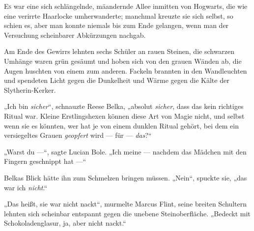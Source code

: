 
\lettrine{E}{s} war eine sich schlängelnde, mäandernde Allee inmitten von Hogwarts, die wie eine verirrte Haarlocke umherwanderte; manchmal kreuzte sie sich selbst, so schien es, aber man konnte niemals bis zum Ende gelangen, wenn man der Versuchung scheinbarer Abkürzungen nachgab.

Am Ende des Gewirrs lehnten sechs Schüler an rauen Steinen, die schwarzen Umhänge waren grün gesäumt und hoben sich von den grauen Wänden ab, die Augen huschten von einem zum anderen. Fackeln brannten in den Wandleuchten und spendeten Licht gegen die Dunkelheit und Wärme gegen die Kälte der Slytherin-Kerker.

„Ich bin \emph{sicher}“, schnauzte Reese Belka, „absolut \emph{sicher}, dass das kein richtiges Ritual war. Kleine Erstlingshexen können diese Art von Magie nicht, und selbst wenn sie es könnten, wer hat je von einem dunklen Ritual gehört, bei dem ein versiegeltes Grauen \emph{geopfert} wird — für — \emph{das}?“

„Warst du —“, sagte Lucian Bole.
„Ich meine — nachdem das Mädchen mit den Fingern geschnippt hat —“

Belkas Blick hätte ihn zum Schmelzen bringen müssen.
„Nein“, spuckte sie, „das war ich \emph{nicht}.“

„Das heißt, sie war nicht nackt“, murmelte Marcus Flint, seine breiten Schultern lehnten sich scheinbar entspannt gegen die unebene Steinoberfläche.
„Bedeckt mit Schokoladenglasur, ja, aber nicht nackt.“

